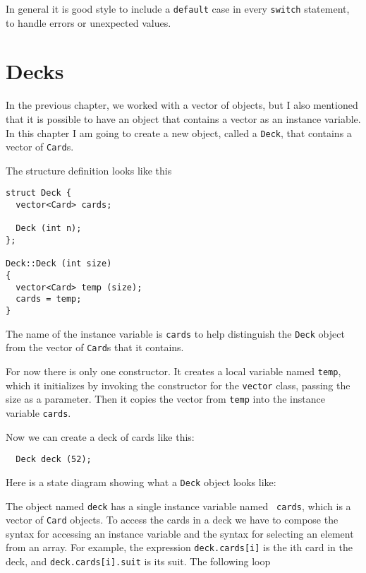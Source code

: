 
In general it is good style to include a {\tt default} case in
every {\tt switch} statement, to handle errors or unexpected values.

\section{Decks}
\label{deck}

In the previous chapter, we worked with a vector of objects,
but I also mentioned that it is possible to have an object
that contains a vector as an instance variable.  In this
chapter I am going to create a new object, called a {\tt Deck},
that contains a vector of {\tt Card}s.


The structure definition looks like this

\begin{lstlisting}
struct Deck {
  vector<Card> cards;

  Deck (int n);
};

Deck::Deck (int size)
{
  vector<Card> temp (size);
  cards = temp;
}
\end{lstlisting}
%
The name of the instance variable is {\tt cards} to help
distinguish the {\tt Deck} object from the vector of {\tt Card}s
that it contains.


For now there is only one constructor.  It creates a local variable
named {\tt temp}, which it initializes by invoking the constructor
for the {\tt vector} class, passing the size as a parameter.
Then it copies the vector from {\tt temp} into the instance
variable {\tt cards}.

Now we can create a deck of cards like this:

\begin{lstlisting}
  Deck deck (52);
\end{lstlisting}
%
Here is a state diagram showing what a
{\tt Deck} object looks like:


\vspace {0.1in}
\centerline{}
\vspace {0.1in}

The object named {\tt deck} has a single instance variable named {\tt
cards}, which is a vector of {\tt Card} objects.  To access the cards
in a deck we have to compose the syntax for accessing an
instance variable and the syntax for selecting an element from an
array.  For example, the expression {\tt deck.cards[i]} is the ith
card in the deck, and {\tt deck.cards[i].suit} is its suit.
The following loop

